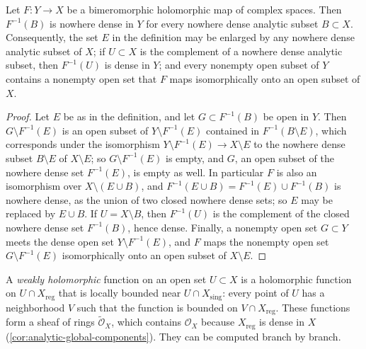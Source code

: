 \begin{lemma}\label{lem:bimeromorphic-preimage-nowhere-dense}
Let $F\colon Y\to X$ be a bimeromorphic holomorphic map of complex spaces. Then $F^{-1}(B)$ is nowhere dense in $Y$ for every nowhere dense analytic subset $B\subset X$. Consequently, the set $E$ in the definition may be enlarged by any nowhere dense analytic subset of $X$; if $U\subset X$ is the complement of a nowhere dense analytic subset, then $F^{-1}(U)$ is dense in $Y$; and every nonempty open subset of $Y$ contains a nonempty open set that $F$ maps isomorphically onto an open subset of $X$.
\end{lemma}
\begin{proof}
Let $E$ be as in the definition, and let $G\subset F^{-1}(B)$ be open in $Y$. Then $G\setminus F^{-1}(E)$ is an open subset of $Y\setminus F^{-1}(E)$ contained in $F^{-1}(B\setminus E)$, which corresponds under the isomorphism $Y\setminus F^{-1}(E)\to X\setminus E$ to the nowhere dense subset $B\setminus E$ of $X\setminus E$; so $G\setminus F^{-1}(E)$ is empty, and $G$, an open subset of the nowhere dense set $F^{-1}(E)$, is empty as well. In particular $F$ is also an isomorphism over $X\setminus(E\cup B)$, and $F^{-1}(E\cup B)=F^{-1}(E)\cup F^{-1}(B)$ is nowhere dense, as the union of two closed nowhere dense sets; so $E$ may be replaced by $E\cup B$. If $U=X\setminus B$, then $F^{-1}(U)$ is the complement of the closed nowhere dense set $F^{-1}(B)$, hence dense. Finally, a nonempty open set $G\subset Y$ meets the dense open set $Y\setminus F^{-1}(E)$, and $F$ maps the nonempty open set $G\setminus F^{-1}(E)$ isomorphically onto an open subset of $X\setminus E$.
\end{proof}

A \emph{weakly holomorphic} function on an open set $U\subset X$ is a holomorphic function on $U\cap X_{\mathrm{reg}}$ that is locally bounded near $U\cap X_{\mathrm{sing}}$: every point of $U$ has a neighborhood $V$ such that the function is bounded on $V\cap X_{\mathrm{reg}}$. These functions form a sheaf of rings $\widetilde{\mathcal O}_X$, which contains $\mathcal O_X$ because $X_{\mathrm{reg}}$ is dense in $X$ (\cref{cor:analytic-global-components}). They can be computed branch by branch.

